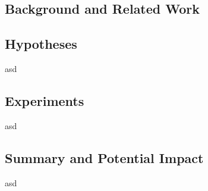 \documentclass{NSF}
\begin{document}
\subsection{Background and Related Work}



\subsection{Hypotheses}
asd


\subsection{Experiments}
asd


\subsection{Summary and Potential Impact}
asd


\newpage
\renewcommand\refname{References}


\end{document}
